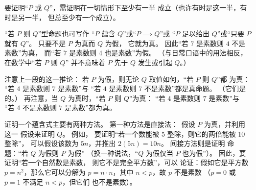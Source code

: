 要证明“\( P \) 或 \( Q \)”，需证明在一切情形下至少有一半
成立（也许有时是这一半，有时是另一半，
但总至少有一个成立）。



“若 \( P \) 则 \( Q \)”型命题也可写作
“\( P \) 蕴含 \( Q \)”或“\( P\implies Q\)”或
“\( P \) 足以给出 \( Q \)”或“只要 $P$ 就有 $Q$”。
只要不是 \( P \) 为真而 \( Q \) 为假，
它就为真。
因此“若 \( 7 \) 是素数则 \( 4 \) 不是素数”为真，
而“若 \( 7 \) 是素数则 \( 4 \) 也是素数”为假。
（与日常口语中的用法相反，在数学中“若 \( P \) 则 \( Q \)”
并不意味着
\( P \) 先于 \( Q \) 发生或引起 \( Q \)。）


注意上一段的这一推论：
若 $P$ 为假，则无论 $Q$ 取值如何，“若 \( P \) 则 \( Q \)”都
为真：
“若 \( 4 \) 是素数则 \( 7 \) 是素数”与
“若 \( 4 \) 是素数则 \( 7 \) 不是素数”都是真命题。
（它们是的。）
再注意，当 $Q$ 为真时，“若 \( P \) 则 \( Q \)”为真：
“若 $4$ 是素数则 $7$ 是素数”与
“若 $4$ 不是素数则 $7$ 是素数”都为真。


证明一个蕴含式主要有两种方法。
第一种方法是直接法：~假设 \( P \) 为真，并利用这一
假设来证明 \( Q \)。
例如，
要证明“若一个数能被 5 整除，则它的两倍能被 10 整除”，
可以假设该数为 \( 5n \)，并推出
\( 2(5n)=10n \)。
间接方法则是证明
命题：“若 \( Q \) 为假则 \( P \) 为假”
（换一种说法，“\( Q \) 为假仅当 \( P \) 也为假”）。
因此，要证明“若一个自然数是素数，
则它不是完全平方数”，可以
论证：假如它是平方数 \( p=n^2 \)，那么它可以分解为
\( p=n\cdot n \)，其中 \( n<p \)，故 \( p \) 不是素数
（\( p=0 \) 或 \( p=1 \) 不满足 \( n<p \)，但它们
也不是素数）。



